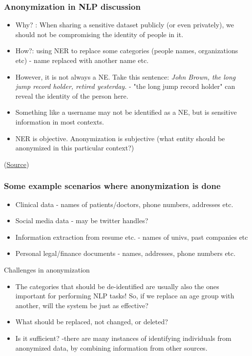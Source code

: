 \documentclass{beamer}
\begin{document}
\begin{frame}
\frametitle{Anonymization in NLP discussion}
\begin{itemize}
    \item Why? : When sharing a sensitive dataset publicly (or even privately), we should not be compromising the identity of people in it. 
\pause \item How?: using NER to replace some categories (people names, organizations etc) - name replaced with another name etc. 
\pause \item However, it is not always a NE. Take this sentence: \textit{John Brown, the long jump record holder, retired yesterday.} - "the long jump record holder" can reveal the identity of the person here. \pause
\item Something like a username may not be identified as a NE, but is sensitive information in most contexts. 
\item NER is objective. Anonymization is subjective (what entity should be anonymized in this particular context?)
\end{itemize}
(\href{http://www.lrec-conf.org/proceedings/lrec2006/pdf/200_pdf.pdf}{Source})
\end{frame}

\begin{frame}
\frametitle{Some example scenarios where anonymization is done}
\begin{itemize}
    \item Clinical data - names of patients/doctors, phone numbers, addresses etc. 
    \item Social media data - may be twitter handles?
    \item Information extraction from resume etc. - names of univs, past companies etc
    \item Personal legal/finance documents - names, addresses, phone numbers etc. 
\end{itemize}
\end{frame}

\begin{frame}{Challenges in anonymization}
    \begin{itemize}
    \item The categories that should be de-identified are usually also the ones important for performing NLP tasks! So, if we replace an age group with another, will the system be just as effective?
\pause \item What should be replaced, not changed, or deleted? 
\pause \item Is it sufficient? -there are many instances of identifying individuals from anonymized data, by combining information from other sources. 
\end{itemize}
\end{frame}
\end{document}
